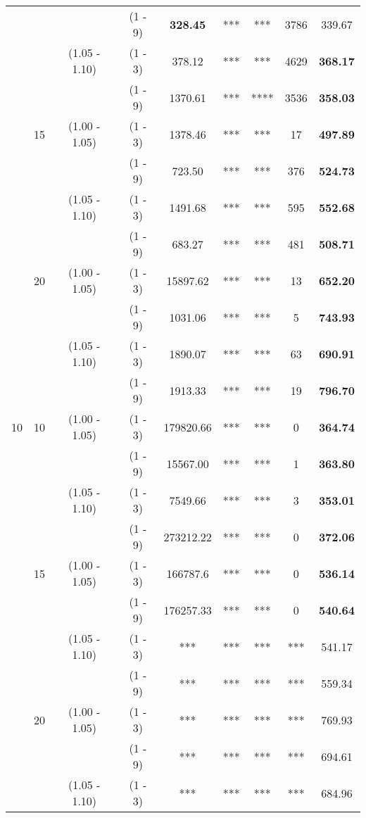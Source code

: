 \documentclass[a4paper,11pt]{article}
\begin{document}
\begin{table}[h!]
\begin{tabular}{ccccccccc}
   &    &  & (1 - 9) & 						  \textbf{328.45} & ***  & *** & 3786& 339.67 \\
   &    & (1.05 - 1.10) & (1 - 3) & 		   378.12 & *** & *** & 4629 & \textbf{368.17} \\
   &    &  & (1 - 9) & 						   1370.61 & *** & **** & 3536 & \textbf{358.03} \\
   & 15 & (1.00 - 1.05) & (1 - 3) & 		   1378.46 & *** & *** & 17 & \textbf{497.89} \\
   &    &  & (1 - 9) & 						   723.50 & *** & *** & 376& \textbf{524.73} \\
   &    & (1.05 - 1.10) & (1 - 3) & 		   1491.68 & *** & *** & 595 & \textbf{552.68} \\
   &    &  & (1 - 9) & 						   683.27 & *** & *** & 481 & \textbf{508.71} \\
   & 20 & (1.00 - 1.05) & (1 - 3) & 		   15897.62 & *** & ***  & 13 & \textbf{652.20} \\
   &    &  & (1 - 9) & 						   1031.06 & *** & *** &  5 & \textbf{743.93} \\
   &    & (1.05 - 1.10) & (1 - 3) & 		   1890.07 & ***  & *** &  63& \textbf{690.91} \\
   &    &  & (1 - 9) & 						   1913.33 & *** & *** &  19 & \textbf{796.70} \\
10 & 10 & (1.00 - 1.05) & (1 - 3) & 		   179820.66 & *** & *** & 0 & \textbf{364.74} \\
   &    &  & (1 - 9) &						   15567.00 & *** & *** &  1& \textbf{363.80} \\
   &    & (1.05 - 1.10) & (1 - 3) & 		   7549.66 & *** & *** & 3 & \textbf{353.01} \\
   &    &  & (1 - 9) & 						   273212.22 & ***  & *** & 0 & \textbf{372.06} \\
   & 15 & (1.00 - 1.05) & (1 - 3) & 		   166787.6 & *** & *** & 0 & \textbf{536.14} \\
   &    &  & (1 - 9) & 						   176257.33 & ***  & *** & 0 & \textbf{540.64} \\
   &    & (1.05 - 1.10) & (1 - 3) & 			*** &*** &*** &*** &  541.17   \\
   &    &  & (1 - 9) & 							*** &*** &*** &*** &  559.34 \\
   & 20 & (1.00 - 1.05) & (1 - 3) & 			*** &*** &*** &*** &  769.93 \\
   &    &  & (1 - 9) & 							*** &*** &*** &*** &  694.61 \\
   &    & (1.05 - 1.10) & (1 - 3) & 			*** &*** &*** &*** &  684.96 \\

\end{tabular}
\end{table}
\end{document}
